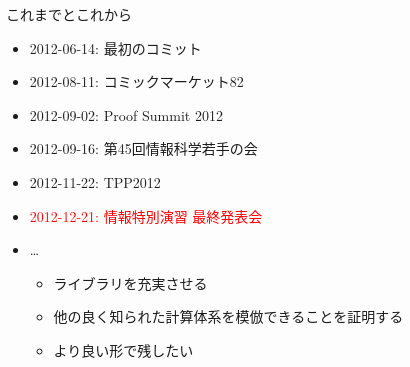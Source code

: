 \documentclass[cjk, 14pt, dvipdfm]{beamer}
\begin{document}
\begin{frame}{これまでとこれから}

 \begin{itemize}
  \item 2012-06-14: 最初のコミット
  \item 2012-08-11: コミックマーケット82
  \item 2012-09-02: Proof Summit 2012
  \item 2012-09-16: 第45回情報科学若手の会
  \item 2012-11-22: TPP2012
  \item \textcolor{red}{2012-12-21: 情報特別演習 最終発表会}
  \item \dots
	\begin{itemize}
	 \item ライブラリを充実させる
	 \item 他の良く知られた計算体系を模倣できることを証明する
	 \item より良い形で残したい
	\end{itemize}
 \end{itemize}

\end{frame}
\end{document}
